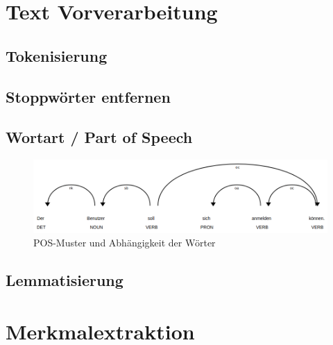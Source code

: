 \lipsum[1]

\section{Text Vorverarbeitung}
\label{subsec:textvorverarbeitung}

\lipsum[3]

\subsection{Tokenisierung}
\label{subsec:tokenisierung}

\lipsum[3]

\subsection{Stoppwörter entfernen}
\label{subsec:stoppwörter}

\lipsum[3]

\subsection{Wortart / Part of Speech}
\label{subsec:pos}

\lipsum[3]

\begin{figure}[!ht]
    \centering
    \includegraphics[width=\linewidth]{media/displaCy.png}
    \caption{POS-Muster und Abhängigkeit der Wörter}
    \label{fig:spacy_dependency}
\end{figure}

\lipsum[3]

\subsection{Lemmatisierung}
\label{subsec:lemmatisierung}

\lipsum[3]

\section{Merkmalextraktion}
\label{sec:merkmalextraktion}

